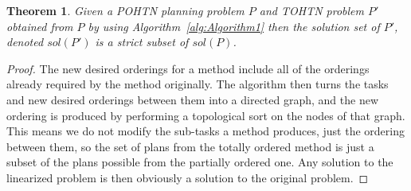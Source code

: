 \documentclass[letterpaper]{article} %
\newtheorem{theorem}{Theorem}
\begin{document}
\begin{theorem}\label{thm:Soundness}
	Given a POHTN planning problem $P$ and TOHTN problem
	$P'$ obtained from $P$ by using Algorithm~\ref{alg:Algorithm1}
	then the solution set of $P'$, denoted $sol(P')$ is a strict subset of $sol(P)$.
\end{theorem}
\begin{proof}
	The new desired orderings for a method include all of the orderings already required by the method originally. The algorithm then turns the tasks and new desired orderings between them into a directed graph, and the new ordering is produced by performing a topological sort on the nodes of that graph. This means we do not modify the sub-tasks a method produces, just the ordering between them, so the set of plans from the totally ordered method is just a subset of the plans possible from the partially ordered one. Any solution to the linearized problem is then obviously a solution to the original problem.
\end{proof}
\end{document}
